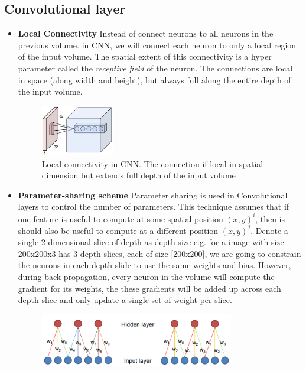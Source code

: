 \subsection{Convolutional layer}
\begin{itemize}
    \item \textbf{Local Connectivity} Instead of connect neurons to all neurons in the previous volume. in CNN, we will connect each neuron to only a local region of the input volume. The spatial extent of this connectivity is a hyper parameter called the \textit{receptive field} of the neuron. The connections are local in space (along width and height), but always full along the entire depth of the input volume.
    \begin{figure}[h!]
        \centering
        \includegraphics[width=0.3\textwidth]{Chapters/Fig/local_connectivity.jpeg}
        \caption{Local connectivity in CNN. The connection if local in spatial dimension but extends full depth of the input volume}
        \label{fig:local_connect}
    \end{figure}
    \pagebreak
    \item \textbf{Parameter-sharing scheme} Parameter sharing is used in Convolutional layers to control the number of parameters. This technique assumes that if one feature is useful to compute at some spatial position $(x,y)^i$, then is should also be useful to compute at a different position $(x,y)^j$. Denote a single 2-dimensional slice of depth as depth size e.g. for a image with size 200x200x3 has 3 depth slices, each of size [200x200], we are going to constrain the neurons in each depth slide to use the same weights and bias. However, during back-propagation, every neuron in the volume will compute the gradient for its weights, the these gradients will be added up across each depth slice and only update a single set of weight per slice.
    \begin{figure}[h!]
        \centering
        \includegraphics[width=0.8\textwidth]{Chapters/Fig/parameter-sharing.png}

\end{figure}
\end{itemize}
